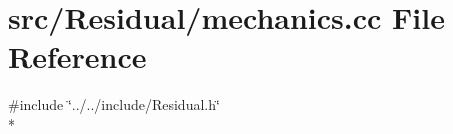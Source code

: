 \section{src/\-Residual/mechanics.cc File Reference}
\label{mechanics_8cc}
{\ttfamily \#include \char`\"{}../../include/\-Residual.\-h\char`\"{}}\\*
